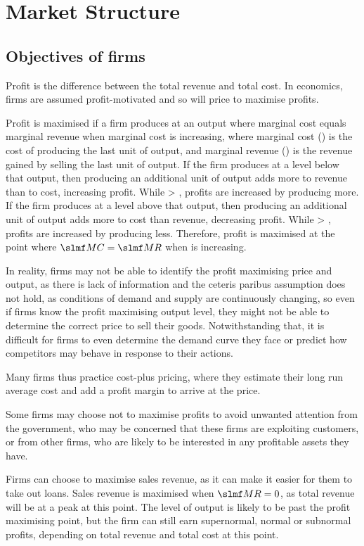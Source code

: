 \documentclass[Economics.tex]{subfiles}
\begin{document}
\chapter{Market Structure}
\section{Objectives of firms}
Profit is the difference between the total revenue and total cost. In economics, firms are assumed profit-motivated and so will price to maximise profits.

Profit is maximised if a firm produces at an output where marginal cost equals marginal revenue when marginal cost is increasing, where marginal cost () is the cost of producing the last unit of output, and marginal revenue () is the revenue gained by selling the last unit of output. If the firm produces at a level below that output, then producing an additional unit of output adds more to revenue than to cost, increasing profit. While  > , profits are increased by producing more. If the firm produces at a level above that output, then producing an additional unit of output adds more to cost than revenue, decreasing profit. While  > , profits are increased by producing less. Therefore, profit is maximised at the point where \(\mrg{C} = \mrg{R}\) when  is increasing.

In reality, firms may not be able to identify the profit maximising price and output, as there is lack of information and the ceteris paribus assumption does not hold, as conditions of demand and supply are continuously changing, so even if firms know the profit maximising output level, they might not be able to determine the correct price to sell their goods. Notwithstanding that, it is difficult for firms to even determine the demand curve they face or predict how competitors may behave in response to their actions.

Many firms thus practice cost-plus pricing, where they estimate their long run average cost and add a profit margin to arrive at the price.

Some firms may choose not to maximise profits to avoid unwanted attention from the government, who may be concerned that these firms are exploiting customers, or from other firms, who are likely to be interested in any profitable assets they have.

Firms can choose to maximise sales revenue, as it can make it easier for them to take out loans. Sales revenue is maximised when \(\mrg{R} = 0\), as total revenue will be at a peak at this point. The level of output is likely to be past the profit maximising point, but the firm can still earn supernormal, normal or subnormal profits, depending on total revenue and total cost at this point.
\end{document}
